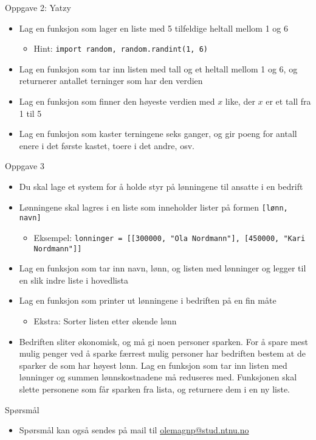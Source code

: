 \documentclass[screen, aspectratio=169]{beamer}
\begin{document}
\begin{frame}{Oppgave 2: Yatzy}
	\begin{itemize}
		\item<+-> Lag en funksjon som lager en liste med 5 tilfeldige heltall mellom 1 og 6
		\begin{itemize}
			\item Hint: \lstinline|import random, random.randint(1, 6)|
		\end{itemize}
		\item<+-> Lag en funksjon som tar inn listen med tall og et heltall mellom 1 og 6, og returnerer antallet terninger som har den verdien
		\item<+-> Lag en funksjon som finner den høyeste verdien med $x$ like, der $x$ er et tall fra 1 til 5
		\item<+-> Lag en funksjon som kaster terningene seks ganger, og gir poeng for antall enere i det første kastet, toere i det andre, osv.
	\end{itemize}
\end{frame}

\begin{frame}{Oppgave 3}
	\begin{itemize}
		\item Du skal lage et system for å holde styr på lønningene til ansatte i en bedrift
		\item Lønningene skal lagres i en liste som inneholder lister på formen \lstinline|[lønn, navn]|
		\begin{itemize}
			\item Eksempel: \lstinline|lonninger = [[300000, "Ola Nordmann"], [450000, "Kari Nordmann"]]|
		\end{itemize}
		\item<+-> Lag en funksjon som tar inn navn, lønn, og listen med lønninger og legger til en slik indre liste i hovedlista
		\item<+-> Lag en funksjon som printer ut lønningene i bedriften på en fin måte
		\begin{itemize}
			\item Ekstra: Sorter listen etter økende lønn
		\end{itemize}
		\item<+-> Bedriften sliter økonomisk, og må gi noen personer sparken. For å spare mest mulig penger ved å sparke færrest mulig personer har bedriften bestem at de sparker de som har høyest lønn. Lag en funksjon som tar inn listen med lønninger og summen lønnskostnadene må reduseres med. Funksjonen skal slette personene som får sparken fra lista, og returnere dem i en ny liste.
	\end{itemize}
\end{frame}

\begin{frame}{Spørsmål}
	\begin{itemize}
		\item Spørsmål kan også sendes på mail til \href{mailto::olemagnp@stud.ntnu.no}{olemagnp@stud.ntnu.no}
	\end{itemize}
\end{frame}
\end{document}
